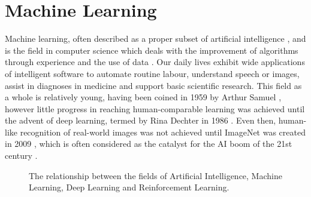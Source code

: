 \chapter{Machine Learning\label{chap:ML}}


Machine learning, often described as a proper subset of artificial
intelligence \cite{Goodfellow-et-al-2016}, and is the field in computer science
which deals with the improvement of algorithms through experience and the use of
data \cite{Mitchell97}. Our daily lives exhibit wide applications of intelligent
software to automate routine labour, understand speech or images, assist in
diagnoses in medicine and support basic scientific research. This field as a
whole is relatively young, having been coined in 1959 by Arthur Samuel
\cite{5392560}, however little progress in reaching human-comparable learning
was achieved until the advent of deep learning, termed by Rina Dechter in 1986
\cite{Rina1986}. Even then, human-like recognition of real-world images was not
achieved until ImageNet was created in 2009 \cite{5206848}, which is often
considered as the catalyst for the AI boom of the 21st century
\cite{hardy_2016}.

\begin{figure}[htp!]
    \centering
    
    \caption{
        The relationship between the fields of Artificial Intelligence,
        Machine Learning, Deep Learning and Reinforcement Learning.
    }
    \label{fig:al-ml-dl}
\end{figure}


